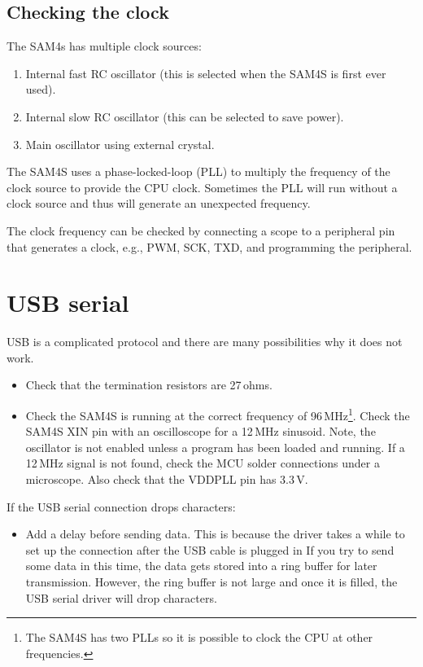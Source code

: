 \subsection{Checking the clock}
\label{checking-the-clock}

The SAM4s has multiple clock sources:

\begin{enumerate}
\item
  Internal fast RC oscillator (this is selected when the SAM4S is first
  ever used).
\item
  Internal slow RC oscillator (this can be selected to save power).
\item
  Main oscillator using external crystal.
\end{enumerate}

The SAM4S uses a phase-locked-loop (PLL) to multiply the frequency of
the clock source to provide the CPU clock. Sometimes the PLL will run
without a clock source and thus will generate an unexpected frequency.

The clock frequency can be checked by connecting a scope to a
peripheral pin that generates a clock, e.g., PWM, SCK, TXD, and
programming the peripheral.


\section{USB serial}
\label{debugging-usb}

USB is a complicated protocol and there are many possibilities why it
does not work.

  \begin{itemize}
  \item
    Check that the termination resistors are 27\,ohms.
    
  \item Check the SAM4S is running at the correct frequency of
    96\,MHz\footnote{The SAM4S has two PLLs so it is possible to clock
      the CPU at other frequencies.}.  Check the SAM4S XIN pin with an
    oscilloscope for a 12\,MHz sinusoid.  Note, the oscillator is not
    enabled unless a program has been loaded and running. If a 12\,MHz
    signal is not found, check the MCU solder connections under a
    microscope. Also check that the VDDPLL pin has 3.3\,V.
  \end{itemize}

  If the USB serial connection drops characters:
 \begin{itemize}
 \item Add a delay before sending data.  This is because the driver
   takes a while to set up the connection after the USB cable is
   plugged in If you try to send some data in this time, the data gets
   stored into a ring buffer for later transmission.  However, the
   ring buffer is not large and once it is filled, the USB serial
   driver will drop characters.
 \end{itemize}

